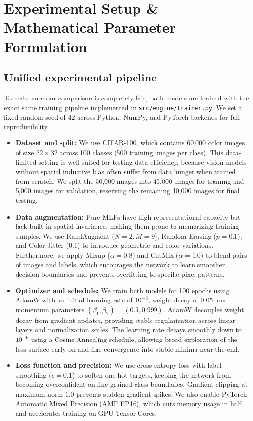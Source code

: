 \section{Experimental Setup \& Mathematical Parameter Formulation}
\label{sec:experimental_setup}

\subsection{Unified experimental pipeline}
To make sure our comparison is completely fair, both models are trained with the exact same training pipeline implemented in \texttt{src/engine/trainer.py}. We set a fixed random seed of 42 across Python, NumPy, and PyTorch backends for full reproducibility.

\begin{itemize}[leftmargin=1.5em]
    \item \textbf{Dataset and split:} We use CIFAR-100, which contains 60,000 color images of size $32 \times 32$ across 100 classes (500 training images per class). This data-limited setting is well suited for testing data efficiency, because vision models without spatial inductive bias often suffer from data hunger when trained from scratch. We split the 50,000 images into 45,000 images for training and 5,000 images for validation, reserving the remaining 10,000 images for final testing.
    \item \textbf{Data augmentation:} Pure MLPs have high representational capacity but lack built-in spatial invariance, making them prone to memorizing training samples. We use RandAugment ($N=2, M=9$), Random Erasing ($p=0.1$), and Color Jitter ($0.1$) to introduce geometric and color variations. Furthermore, we apply Mixup ($\alpha=0.8$) and CutMix ($\alpha=1.0$) to blend pairs of images and labels, which encourages the network to learn smoother decision boundaries and prevents overfitting to specific pixel patterns.
    \item \textbf{Optimizer and schedule:} We train both models for 100 epochs using AdamW with an initial learning rate of $10^{-3}$, weight decay of $0.05$, and momentum parameters $(\beta_1, \beta_2) = (0.9, 0.999)$. AdamW decouples weight decay from gradient updates, providing stable regularization across linear layers and normalization scales. The learning rate decays smoothly down to $10^{-6}$ using a Cosine Annealing schedule, allowing broad exploration of the loss surface early on and fine convergence into stable minima near the end.
    \item \textbf{Loss function and precision:} We use cross-entropy loss with label smoothing ($\epsilon=0.1$) to soften one-hot targets, keeping the network from becoming overconfident on fine-grained class boundaries. Gradient clipping at maximum norm $1.0$ prevents sudden gradient spikes. We also enable PyTorch Automatic Mixed Precision (AMP FP16), which cuts memory usage in half and accelerates training on GPU Tensor Cores.
\end{itemize}

